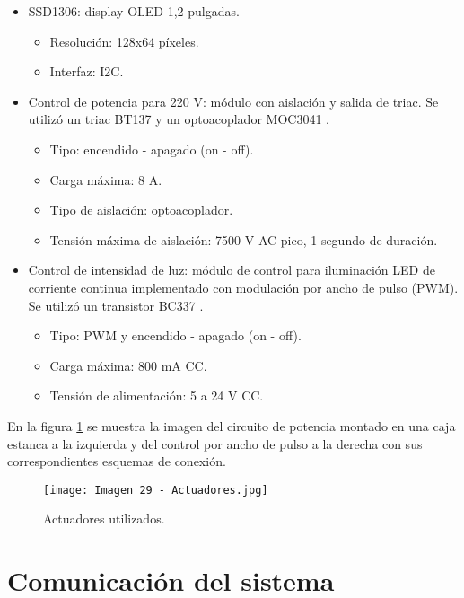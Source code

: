 \begin{itemize}
\item SSD1306: display OLED 1,2 pulgadas.
	\begin{itemize}
		\item Resolución: 128x64 píxeles.
		\item Interfaz: I2C.
	\end{itemize}
	\item Control de potencia para 220 V: módulo con aislación y salida de triac. Se utilizó un triac BT137 \citep{33} y un optoacoplador MOC3041 \citep{34}.
	\begin{itemize}
		\item Tipo: encendido - apagado (on - off).
		\item Carga máxima: 8 A.
		\item Tipo de aislación: optoacoplador.
		\item Tensión máxima de aislación: 7500 V AC pico, 1 segundo de duración.
	\end{itemize}
	\item Control de intensidad de luz: módulo de control para iluminación LED de corriente continua implementado con modulación por ancho de pulso (PWM). Se utilizó un transistor BC337 \citep{35}.
	\begin{itemize}
		\item Tipo: PWM y encendido - apagado (on - off).
		\item Carga máxima: 800 mA CC.
		\item Tensión de alimentación: 5 a 24 V CC.
	\end{itemize}
\end{itemize}

En la figura \ref{fig:29} se muestra la imagen del circuito de potencia montado en una caja estanca a la izquierda y del control por ancho de pulso a la derecha con sus correspondientes esquemas de conexión.

\begin{figure}[h]
\centering
\texttt{[image: Imagen 29 - Actuadores.jpg]}
\caption[Actuadores]{Actuadores utilizados.}
\label{fig:29}
\end{figure}

\section{Comunicación del sistema}

